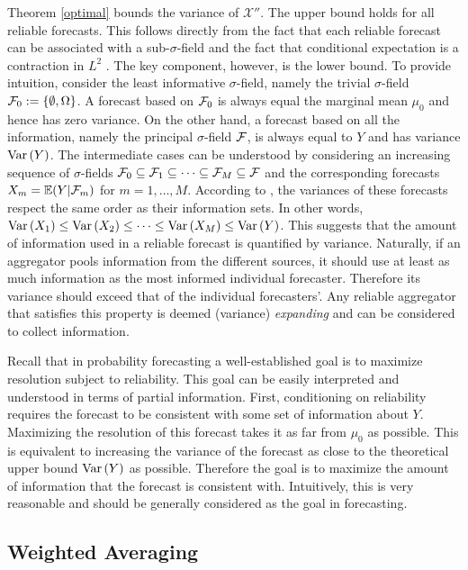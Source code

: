 \documentclass[11pt]{article}
\newcommand{\E}{\mathbb{E}}
\theoremstyle{definition}
\theoremstyle{definition}
\def\F{{\cal F}}
\def\E{{\mathbb E}}
\def\Var{{\rm Var}\,}
\begin{document}
Theorem \ref{optimal} bounds the variance of $\mathcal{X}''$. The upper bound holds for all reliable forecasts. This follows directly from the fact that each reliable forecast can be associated with a sub-$\sigma$-field and the fact that conditional expectation is a contraction in $L^2$ \citep[Theorem 5.1.4.]{durrett2010probability}. The key component, however, is the lower bound.
To provide intuition, consider the least informative $\sigma$-field, namely the trivial $\sigma$-field $\F_0 := \{\emptyset, \Omega\}$. A forecast based on $\F_0$ is always equal the marginal mean $\mu_0$ and hence has zero variance. On the other hand, a forecast based on all the information, namely the principal $\sigma$-field $\F$, is always equal to $Y$ and has variance $\Var(Y)$. 
The intermediate cases can be understood by considering an increasing sequence of $\sigma$-fields $\F_0 \subseteq \F_1 \subseteq \dots \subseteq \F_M \subseteq \F$ and the corresponding forecasts $X_m = \E(Y|\F_m)$ for $m = 1, \dots, M$. According to \citet[Proposition 2.1]{satopaamodeling2}, the variances of these forecasts respect the same order as their information sets. In other words, $\Var(X_1) \leq \Var(X_2) \leq \dots \leq \Var(X_M) \leq \Var(Y)$. This suggests that the amount of information used in a reliable forecast is quantified by variance. Naturally, if an aggregator pools information from the different sources, it should use at least as much information as the most informed individual forecaster.  Therefore its variance should exceed that of the individual forecasters'. Any reliable aggregator that satisfies this property is deemed (variance) \textit{expanding} and can be considered to collect information. 

Recall that in probability forecasting a well-established goal is to maximize resolution subject to reliability. This goal can be easily interpreted and understood in terms of partial information. First, conditioning on reliability requires the forecast to be consistent with some set of information about $Y$. Maximizing the resolution of this forecast takes it as far from $\mu_0$ as possible. This is equivalent to increasing the variance of the forecast as close to the theoretical upper bound $\Var(Y)$ as possible. Therefore the goal is to maximize the amount of information that the forecast is consistent with. Intuitively, this is very reasonable and should be generally considered as the goal in forecasting.



\subsection{Weighted Averaging} \label{contraction}
\end{document}
